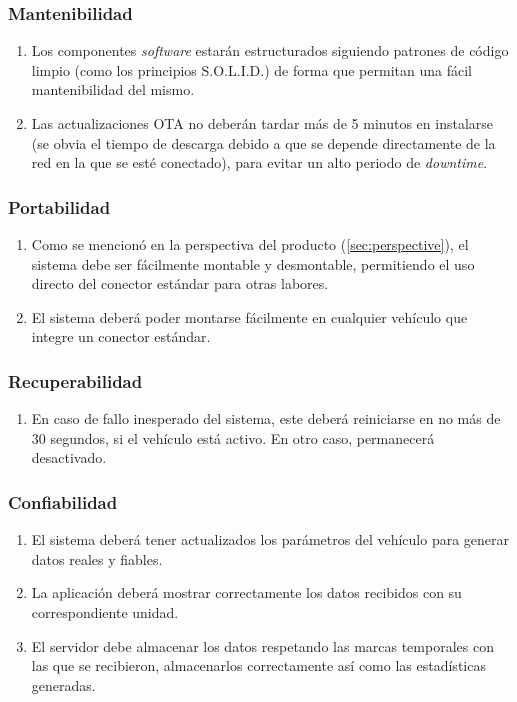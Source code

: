 \subsubsection{Mantenibilidad}
\begin{enumerate}[resume, label=\textbf{\texttt{RNF-\arabic*}}]
  \item\label{nf:solid} Los componentes \textit{software} estarán estructurados
  siguiendo patrones de código limpio (como los principios S.O.L.I.D.) de forma
  que permitan una fácil mantenibilidad del mismo.
  \item\label{nf:ota-time} Las actualizaciones OTA no deberán tardar más de 
  5 minutos en instalarse (se obvia el tiempo de descarga debido a que se depende
  directamente de la red en la que se esté conectado), para evitar un alto periodo
  de \textit{downtime}.
\end{enumerate}

\subsubsection{Portabilidad}
\begin{enumerate}[resume, label=\textbf{\texttt{RNF-\arabic*}}]
  \item\label{nf:easy-conn} Como se mencionó en la perspectiva del producto (\ref{sec:perspective}),
  el sistema debe ser fácilmente montable y desmontable, permitiendo el uso directo
  del conector estándar para otras labores.
  \item\label{nf:conn} El sistema deberá poder montarse fácilmente en cualquier
  vehículo que integre un conector estándar.
\end{enumerate}

\subsubsection{Recuperabilidad}
\begin{enumerate}[resume, label=\textbf{\texttt{RNF-\arabic*}}]
  \item\label{nf:restart-time} En caso de fallo inesperado del sistema, este
  deberá reiniciarse en no más de 30 segundos, si el vehículo está activo. En otro
  caso, permanecerá desactivado.
\end{enumerate}

\subsubsection{Confiabilidad}
\begin{enumerate}[resume, label=\textbf{\texttt{RNF-\arabic*}}]
  \item\label{nf:vehicle-data} El sistema deberá tener actualizados los parámetros
  del vehículo para generar datos reales y fiables.
  \item\label{nf:app-data} La aplicación deberá mostrar correctamente los datos
  recibidos con su correspondiente unidad.
  \item\label{nf:server-data} El servidor debe almacenar los datos respetando las
  marcas temporales con las que se recibieron, almacenarlos correctamente así como
  las estadísticas generadas.
\end{enumerate}

